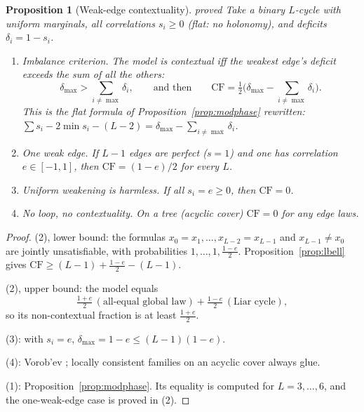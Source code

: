 \documentclass[11pt]{article}
\newtheorem{proposition}[theorem]{Proposition}
\theoremstyle{definition}
\theoremstyle{remark}
\newcommand{\CF}{\mathrm{CF}}
\newcommand{\st}[1]{\textsf{\small\color{gray}#1}}
\begin{document}
\begin{proposition}[Weak-edge contextuality]\label{prop:weakedge}\st{proved}
Take a binary $L$-cycle with uniform marginals, all correlations $s_i\ge0$ (flat: no holonomy), and deficits $\delta_i=1-s_i$.
\begin{enumerate}
  \item \emph{Imbalance criterion.} The model is contextual iff the weakest edge's deficit exceeds the sum of all the others:
  \[
  \delta_{\max}>\textstyle\sum_{i\neq\max}\delta_i ,\qquad\text{and then}\qquad \CF=\tfrac12\bigl(\delta_{\max}-\sum_{i\neq\max}\delta_i\bigr).
  \]
  This is the flat formula of Proposition~\ref{prop:modphase} rewritten: $\sum s_i-2\min s_i-(L-2)=\delta_{\max}-\sum_{i\ne\max}\delta_i$.
  \item \emph{One weak edge.} If $L-1$ edges are perfect ($s=1$) and one has correlation $e\in[-1,1]$, then $\CF=(1-e)/2$ for every $L$.
  \item \emph{Uniform weakening is harmless.} If all $s_i=e\ge0$, then $\CF=0$.
  \item \emph{No loop, no contextuality.} On a tree (acyclic cover) $\CF=0$ for any edge laws.
\end{enumerate}
\end{proposition}
\begin{proof}
(2), lower bound: the formulas $x_0{=}x_1,\dots,x_{L-2}{=}x_{L-1}$ and $x_{L-1}{\ne}x_0$ are jointly unsatisfiable, with probabilities $1,\dots,1,\tfrac{1-e}2$. Proposition~\ref{prop:lbell} gives $\CF\ge(L-1)+\tfrac{1-e}2-(L-1)$.

(2), upper bound: the model equals
\[
\tfrac{1+e}2\,(\text{all-equal global law})+\tfrac{1-e}2\,(\text{Liar cycle}),
\]
so its non-contextual fraction is at least $\tfrac{1+e}2$.

(3): with $s_i=e$, $\delta_{\max}=1-e\le(L-1)(1-e)$.

(4): Vorob'ev \cite{vorobev}; locally consistent families on an acyclic cover always glue.

(1): Proposition~\ref{prop:modphase}. Its equality is computed for $L=3,\dots,6$, and the one-weak-edge case is proved in (2).
\end{proof}
\end{document}
